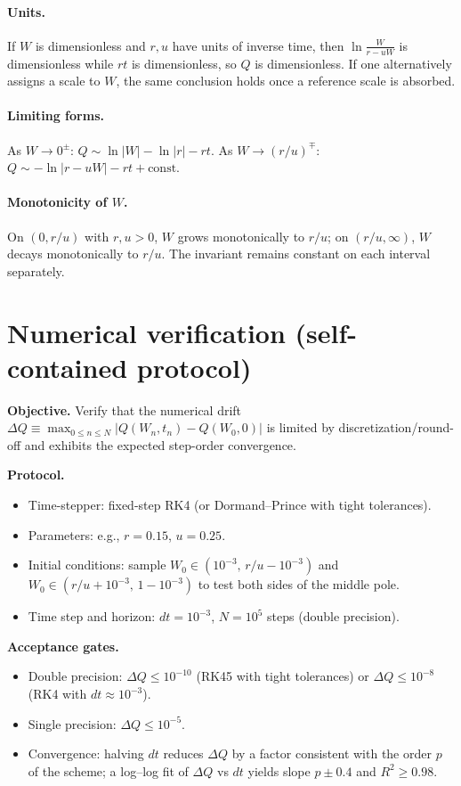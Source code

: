 \documentclass[11pt]{article}
\begin{document}
\paragraph{Units.} If $W$ is dimensionless and $r,u$ have units of inverse time, then $\ln\!\tfrac{W}{r-uW}$ is dimensionless while $rt$ is dimensionless, so $Q$ is dimensionless. If one alternatively assigns a scale to $W$, the same conclusion holds once a reference scale is absorbed.

\paragraph{Limiting forms.}
As $W\to 0^\pm$: $Q\sim \ln|W|-\ln|r| - r t$.  
As $W\to (r/u)^\mp$: $Q\sim -\ln\big|r-uW\big| - r t + \text{const}$.

\paragraph{Monotonicity of $W$.}
On $(0,r/u)$ with $r,u>0$, $W$ grows monotonically to $r/u$; on $(r/u,\infty)$, $W$ decays monotonically to $r/u$. The invariant remains constant on each interval separately.

\section{Numerical verification (self-contained protocol)}
\textbf{Objective.} Verify that the numerical drift $\Delta Q \equiv \max_{0\le n\le N} |Q(W_n,t_n)-Q(W_0,0)|$ is limited by discretization/round-off and exhibits the expected step-order convergence.

\textbf{Protocol.}
\begin{itemize}
\item Time-stepper: fixed-step RK4 (or Dormand--Prince with tight tolerances).
\item Parameters: e.g., $r=0.15$, $u=0.25$.
\item Initial conditions: sample $W_0\in(10^{-3},\, r/u-10^{-3})$ and $W_0\in(r/u+10^{-3},\, 1-10^{-3})$ to test both sides of the middle pole.
\item Time step and horizon: $dt=10^{-3}$, $N=10^5$ steps (double precision).
\end{itemize}

\textbf{Acceptance gates.}
\begin{itemize}
\item Double precision: $\Delta Q \le 10^{-10}$ (RK45 with tight tolerances) or $\Delta Q \le 10^{-8}$ (RK4 with $dt\approx 10^{-3}$).
\item Single precision: $\Delta Q \le 10^{-5}$.
\item Convergence: halving $dt$ reduces $\Delta Q$ by a factor consistent with the order $p$ of the scheme; a log--log fit of $\Delta Q$ vs $dt$ yields slope $p\pm 0.4$ and $R^2\ge 0.98$.
\end{itemize}
\end{document}
